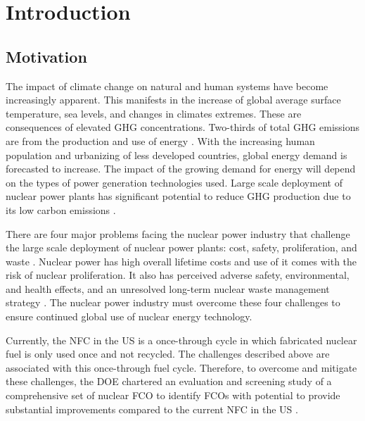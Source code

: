\chapter[Introduction]{Introduction}

\section{Motivation}

The impact of climate change on natural and human systems have 
become increasingly apparent.
This manifests in the increase of global average surface 
temperature, sea levels, and changes in climates extremes.
These are consequences of elevated \gls{GHG} concentrations. 
Two-thirds of total \gls{GHG} emissions are from the production 
and use of energy \cite{noauthor_climate_2018}. 
With the increasing human population and urbanizing of less 
developed countries, global energy demand is forecasted to 
increase. 
The impact of the growing demand for energy will depend on the 
types of power generation technologies used. 
Large scale deployment of nuclear power plants has significant 
potential to reduce \gls{GHG} production due to its low 
carbon emissions \cite{noauthor_climate_2018}.  


There are four major problems facing the nuclear power industry
that challenge the large scale deployment of nuclear power 
plants: cost, safety, proliferation, and waste 
\cite{massachusetts_institute_of_technology_future_2003}. 
Nuclear power has high overall lifetime costs and use of it comes 
with the risk of nuclear proliferation. 
It also has perceived adverse safety, environmental, and health 
effects, and an unresolved long-term nuclear waste management 
strategy \cite{massachusetts_institute_of_technology_future_2003}. 
The nuclear power industry must overcome these four challenges 
to ensure continued global use of nuclear energy technology. 

Currently, the \gls{NFC} in the \gls{US} is a once-through cycle 
in which fabricated nuclear fuel is only used once and not recycled. 
The challenges described above are associated with this 
once-through fuel cycle. 
Therefore, to overcome and mitigate these challenges, the 
\gls{DOE} chartered an evaluation and screening study 
of a comprehensive set of nuclear \gls{FCO} 
to identify \glspl{FCO} with potential 
to provide substantial improvements compared to the current 
\gls{NFC} in the \gls{US} \cite{wigeland_nuclear_2014}. 

